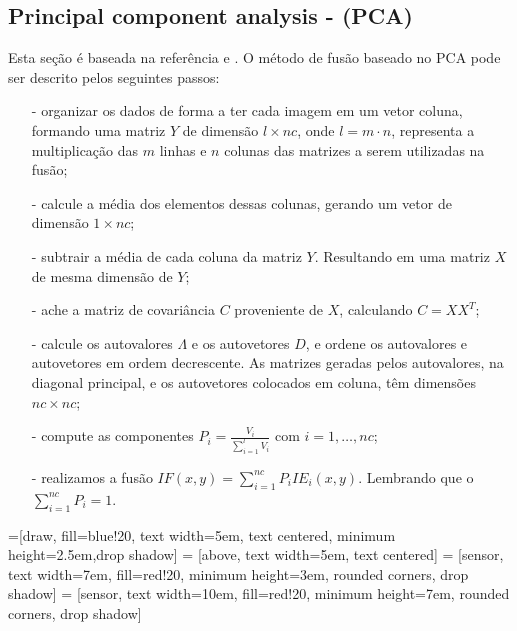 \documentclass[conference]{IEEEtran}
\begin{document}
\subsection{Principal component analysis - (PCA) }
Esta seção é baseada na referência \cite{n_r} e \cite{mit}. O método de fusão baseado no PCA pode ser descrito pelos seguintes passos:
\begin{itemize}
\item[-] organizar os dados de forma a ter cada imagem em um vetor coluna, formando uma matriz $Y$ de dimensão $l\times nc$, onde $l=m\cdot n$, representa a multiplicação das $m$ linhas e $n$ colunas das matrizes a serem utilizadas na fusão;
\item[-] calcule a média dos elementos dessas colunas, gerando um vetor de dimensão $1\times nc$;
\item[-] subtrair a média de cada coluna da matriz $Y$. Resultando em uma matriz $X$ de mesma dimensão de $Y$; 
\item[-] ache a matriz de covariância $C$ proveniente de $X$, calculando $C=XX^T$;
\item[-] calcule os autovalores $\Lambda$ e os autovetores $D$, e ordene os autovalores e autovetores em ordem decrescente. As matrizes geradas pelos autovalores, na diagonal principal, e os autovetores colocados em coluna, têm dimensões $nc\times nc$;
\item[-] compute as componentes $P_i=\frac{V_i}{\sum_{i=1}^l V_i}$ com $i=1,\dots,nc$;
\item[-] realizamos a fusão $IF(x,y)=\sum_{i=1}^{nc}P_iIE_i(x,y)$. Lembrando que o $\sum_{i=1}^{nc}P_i=1$.
\end{itemize}
=[draw, fill=blue!20, text width=5em, 
    text centered, minimum height=2.5em,drop shadow]
 = [above, text width=5em, text centered]
 = [sensor, text width=7em, fill=red!20, 
    minimum height=3em, rounded corners, drop shadow]
 = [sensor, text width=10em, fill=red!20, 
    minimum height=7em, rounded corners, drop shadow]
\def\blockdist{2.3}
\def\edgedist{2.5}
\end{document}
